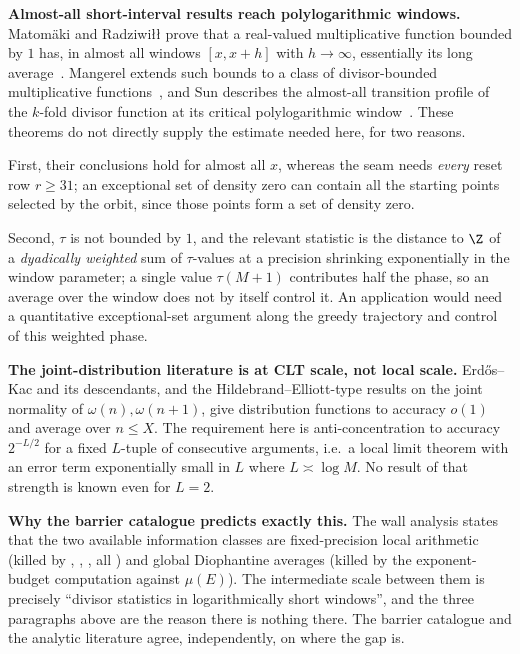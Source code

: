 \textbf{Almost-all short-interval results reach polylogarithmic windows.}  Matom\"aki and
Radziwi\l{}\l{} prove that a real-valued multiplicative function bounded by $1$ has, in almost all
windows $[x,x+h]$ with $h\to\infty$, essentially its long
average~\cite[Theorem~1, pp.~1--2]{matomakiradziwill}.  Mangerel extends such bounds to a class of
divisor-bounded multiplicative
functions~\cite[Theorem~1.7, p.~7, and Corollary~1.8, pp.~7--8]{mangerel2021}, and Sun describes the
almost-all transition profile of the $k$-fold divisor function at its critical polylogarithmic
window~\cite[Theorem~1.1 and Corollary~1.2, p.~3]{sun2026}.  These theorems do not directly supply
the estimate needed here, for two reasons.

First, their conclusions hold for almost all $x$, whereas the seam needs \emph{every} reset row
$r\ge31$; an exceptional set of density zero can contain all the starting points selected by the
orbit, since those points form a set of density zero.

Second, $\tau$ is not bounded by $1$, and the relevant statistic is the distance to $\Z$ of a
\emph{dyadically weighted} sum of $\tau$-values at a precision shrinking exponentially in the window
parameter; a single value $\tau(M+1)$ contributes half the phase, so an average over the window does
not by itself control it.  An application would need a quantitative exceptional-set argument along
the greedy trajectory and control of this weighted phase.

\textbf{The joint-distribution literature is at CLT scale, not local scale.} Erd\H{o}s--Kac and
its descendants, and the Hildebrand--Elliott-type results on the joint normality of
$\omega(n),\omega(n+1)$, give distribution functions to accuracy $o(1)$ and average over
$n\le X$. The requirement here is anti-concentration to accuracy $2^{-L/2}$ for a fixed
$L$-tuple of consecutive arguments, i.e.\ a local limit theorem with an error term
exponentially small in $L$ where $L\asymp\log M$. No result of that strength is known even for
$L=2$.

\textbf{Why the barrier catalogue predicts exactly this.} The wall analysis states that the two
available information classes are fixed-precision local arithmetic (killed by
,
,
, all ) and global
Diophantine averages (killed by the exponent-budget computation against $\mu(E)$). The
intermediate scale between them is precisely ``divisor statistics in logarithmically short
windows'', and the three paragraphs above are the reason there is nothing there. The barrier
catalogue and the analytic literature agree, independently, on where the gap is.

